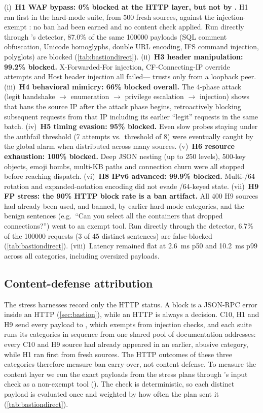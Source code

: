 \documentclass[10pt,twocolumn]{article}
\begin{document}
(i)~\textbf{H1 WAF bypass: 0\% blocked at the HTTP layer, but not by
\bastion{}.} H1 ran first in the hard-mode suite, from 500 fresh sources,
against the injection-exempt : no ban had been earned
and no content check applied. Run directly through \bastion{}'s detector,
87.0\% of the same \num{100000} payloads (SQL comment obfuscation, Unicode
homoglyphs, double URL encoding, IFS command injection, polyglots) are
blocked (\cref{tab:bastiondirect}).
(ii)~\textbf{H3 header manipulation: 99.2\% blocked.} X-Forwarded-For
injection, CF-Connecting-IP override attempts and Host header injection all
failed---\sys{} trusts only  from a loopback peer.
(iii)~\textbf{H4 behavioral mimicry: 66\% blocked overall.} The 4-phase
attack (legit handshake $\to$ enumeration $\to$ privilege escalation $\to$
injection) shows that \sys{} bans the source IP after the attack phase
begins, retroactively blocking subsequent requests from that IP including
its earlier ``legit'' requests in the same batch.
(iv)~\textbf{H5 timing evasion: 95\% blocked.} Even slow probes staying
under the authfail threshold (7 attempts vs.\ threshold of 8) were
eventually caught by the global alarm when distributed across many sources.
(v)~\textbf{H6 resource exhaustion: 100\% blocked.} Deep JSON nesting (up to
250 levels), 500-key objects, emoji bombs, multi-KB paths and connection
churn were all stopped before reaching dispatch.
(vi)~\textbf{H8 IPv6 advanced: 99.9\% blocked.} Multi-/64 rotation and
expanded-notation encoding did not evade /64-keyed state.
(vii)~\textbf{H9 FP stress: the 90\% HTTP block rate is a ban artifact.}
All 400 H9 sources had already been used, and banned, by earlier hard-mode
categories, and the benign sentences (e.g.\ ``Can you select all the
containers that dropped connections?'') went to an exempt tool. Run directly
through the detector, 6.7\% of the \num{100000} requests (3 of 45 distinct
sentences) are false-blocked (\cref{tab:bastiondirect}).
(viii)~Latency remained flat at \SI{2.6}{ms} p50 and \SI{10.2}{ms} p99
across all categories, including oversized payloads.

\subsection{Content-defense attribution}\label{sec:attrib}
The stress harnesses record only the HTTP status. A \bastion{} block is a
JSON-RPC error inside an HTTP  (\cref{sec:bastion}), while an
HTTP  is always a \sys{} decision. C10, H1 and H9 send every
payload to , which \bastion{} exempts from injection
checks, and each suite runs its categories in sequence from one shared pool of
documentation addresses: every C10 and H9 source had already appeared in an
earlier, abusive category, while H1 ran first from fresh sources. The HTTP
outcomes of these three categories therefore measure \sys{} ban carry-over,
not content defense. To measure the content layer we run the exact payloads
from the stress plans through \bastion{}'s input check as a non-exempt tool
(). The check is deterministic, so
each distinct payload is evaluated once and weighted by how often the plan
sent it (\cref{tab:bastiondirect}).
\end{document}
